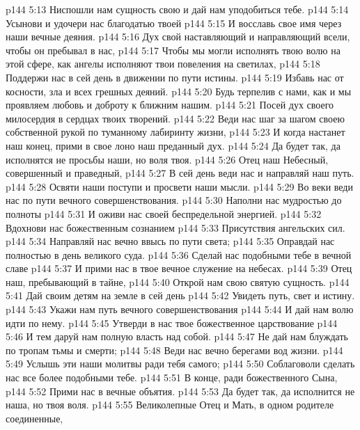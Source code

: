 \vs p144 5:13 \hsetoff Ниспошли нам сущность свою и дай нам уподобиться тебе.
\vs p144 5:14 Усынови и удочери нас благодатью твоей
\vs p144 5:15 \hsetoff И восславь свое имя через наши вечные деяния.
\vs p144 5:16 Дух свой наставляющий и направляющий всели, чтобы он пребывал в нас,
\vs p144 5:17 \hsetoff Чтобы мы могли исполнять твою волю на этой сфере, как ангелы исполняют твои повеления на светилах,
\vs p144 5:18 Поддержи нас в сей день в движении по пути истины.
\vs p144 5:19 \hsetoff Избавь нас от косности, зла и всех грешных деяний.
\vs p144 5:20 Будь терпелив с нами, как и мы проявляем любовь и доброту к ближним нашим.
\vs p144 5:21 \hsetoff Посей дух своего милосердия в сердцах твоих творений.
\vs p144 5:22 Веди нас шаг за шагом своею собственной рукой по туманному лабиринту жизни,
\vs p144 5:23 \hsetoff И когда настанет наш конец, прими в свое лоно наш преданный дух.
\vs p144 5:24 Да будет так, да исполнятся не просьбы наши, но воля твоя.
\separatorline
\vs p144 5:26 Отец наш Небесный, совершенный и праведный,
\vs p144 5:27 \hsetoff В сей день веди нас и направляй наш путь.
\vs p144 5:28 Освяти наши поступи и просвети наши мысли.
\vs p144 5:29 \hsetoff Во веки веди нас по пути вечного совершенствования.
\vs p144 5:30 Наполни нас мудростью до полноты
\vs p144 5:31 \hsetoff И оживи нас своей беспредельной энергией.
\vs p144 5:32 Вдохнови нас божественным сознанием
\vs p144 5:33 \hsetoff Присутствия ангельских сил.
\vs p144 5:34 Направляй нас вечно ввысь по пути света;
\vs p144 5:35 \hsetoff Оправдай нас полностью в день великого суда.
\vs p144 5:36 Сделай нас подобными тебе в вечной славе
\vs p144 5:37 \hsetoff И прими нас в твое вечное служение на небесах.
\separatorline
\vs p144 5:39 Отец наш, пребывающий в тайне,
\vs p144 5:40 \hsetoff Открой нам свою святую сущность.
\vs p144 5:41 Дай своим детям на земле в сей день
\vs p144 5:42 \hsetoff Увидеть путь, свет и истину.
\vs p144 5:43 Укажи нам путь вечного совершенствования
\vs p144 5:44 \hsetoff И дай нам волю идти по нему.
\vs p144 5:45 Утверди в нас твое божественное царствование
\vs p144 5:46 \hsetoff И тем даруй нам полную власть над собой.
\vs p144 5:47 Не дай нам блуждать по тропам тьмы и смерти;
\vs p144 5:48 \hsetoff Веди нас вечно берегами вод жизни.
\vs p144 5:49 Услышь эти наши молитвы ради тебя самого;
\vs p144 5:50 \hsetoff Соблаговоли сделать нас все более подобными тебе.
\vs p144 5:51 В конце, ради божественного Сына,
\vs p144 5:52 \hsetoff Прими нас в вечные объятия.
\vs p144 5:53 Да будет так, да исполнится не наша, но твоя воля.
\separatorline
\vs p144 5:55 Великолепные Отец и Мать, в одном родителе соединенные,
